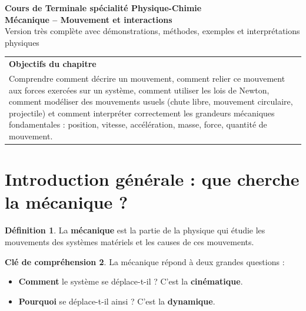 \documentclass[11pt,a4paper]{article}
\theoremstyle{definition}
\newtheorem{definition}{Définition}[section]
\newtheorem{interpretation}[definition]{Clé de compréhension}
\theoremstyle{plain}
\theoremstyle{remark}
\begin{document}
\begin{center}
    {\LARGE \textbf{Cours de Terminale spécialité Physique-Chimie}}\\[0.2cm]
    {\Huge \textbf{Mécanique -- Mouvement et interactions}}\\[0.3cm]
    {\large Version très complète avec démonstrations, méthodes, exemples et interprétations physiques}
\end{center}

\vspace{0.4cm}

\begin{center}
\renewcommand{\arraystretch}{1.4}
\begin{tabular}{|p{}|}
\hline
\textbf{Objectifs du chapitre}\\
Comprendre comment décrire un mouvement, comment relier ce mouvement aux forces exercées sur un système, comment utiliser les lois de Newton, comment modéliser des mouvements usuels (chute libre, mouvement circulaire, projectile) et comment interpréter correctement les grandeurs mécaniques fondamentales : position, vitesse, accélération, masse, force, quantité de mouvement.\\
\hline
\end{tabular}
\end{center}

\tableofcontents
\newpage

\section{Introduction générale : que cherche la mécanique ?}

\begin{definition}
La \textbf{mécanique} est la partie de la physique qui étudie les mouvements des systèmes matériels et les causes de ces mouvements.
\end{definition}

\begin{interpretation}
La mécanique répond à deux grandes questions :
\begin{itemize}
    \item \textbf{Comment} le système se déplace-t-il ? C'est la \textbf{cinématique}.
    \item \textbf{Pourquoi} se déplace-t-il ainsi ? C'est la \textbf{dynamique}.
\end{itemize}
\end{interpretation}
\end{document}
